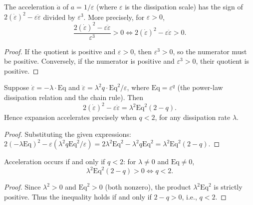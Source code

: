 \begin{theorem}
The acceleration $\ddot{a}$ of $a = 1/\varepsilon$ (where $\varepsilon$ is the dissipation scale) has the sign of $2(\dot{\varepsilon})^2 - \varepsilon \ddot{\varepsilon}$ divided by $\varepsilon^3$.  More precisely, for $\varepsilon > 0$,
\begin{equation}
\frac{2(\dot{\varepsilon})^2 - \varepsilon \ddot{\varepsilon}}{\varepsilon^3} > 0 \iff 2(\dot{\varepsilon})^2 - \varepsilon \ddot{\varepsilon} > 0.
\end{equation}
\begin{proof}
If the quotient is positive and $\varepsilon > 0$, then $\varepsilon^3 > 0$, so the numerator must be positive.  Conversely, if the numerator is positive and $\varepsilon^3 > 0$, their quotient is positive.
\end{proof}
\end{theorem}

\begin{theorem}
Suppose $\dot{\varepsilon} = -\lambda \cdot \text{Eq}$ and $\ddot{\varepsilon} = \lambda^2 q \cdot \text{Eq}^2 / \varepsilon$, where $\text{Eq} = \varepsilon^q$ (the power-law dissipation relation and the chain rule).  Then
\begin{equation}
2(\dot{\varepsilon})^2 - \varepsilon \ddot{\varepsilon} = \lambda^2 \text{Eq}^2 (2 - q).
\end{equation}
Hence expansion accelerates precisely when $q < 2$, for any dissipation rate $\lambda$.
\begin{proof}
Substituting the given expressions: $2(-\lambda \text{Eq})^2 - \varepsilon (\lambda^2 q \text{Eq}^2 / \varepsilon) = 2\lambda^2 \text{Eq}^2 - \lambda^2 q \text{Eq}^2 = \lambda^2 \text{Eq}^2 (2 - q)$.
\end{proof}
\end{theorem}

\begin{theorem}
Acceleration occurs if and only if $q < 2$: for $\lambda \neq 0$ and $\text{Eq} \neq 0$,
\begin{equation}
\lambda^2 \text{Eq}^2 (2 - q) > 0 \iff q < 2.
\end{equation}
\begin{proof}
Since $\lambda^2 > 0$ and $\text{Eq}^2 > 0$ (both nonzero), the product $\lambda^2 \text{Eq}^2$ is strictly positive.  Thus the inequality holds if and only if $2 - q > 0$, i.e., $q < 2$.
\end{proof}
\end{theorem}

